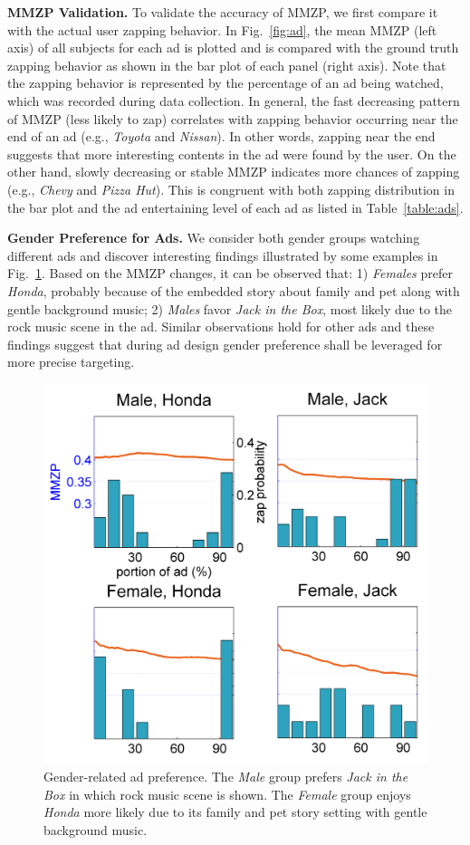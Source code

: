 \documentclass[twoside,leqno,twocolumn]{article}
\begin{document}
\noindent \textbf{MMZP Validation.} To validate the accuracy of MMZP, we first compare it with the actual user zapping behavior. In Fig.~\ref{fig:ad}, the mean MMZP (left axis) of all subjects for each ad is plotted and is compared with the ground truth zapping behavior as shown in the bar plot of each panel (right axis). Note that the zapping behavior is represented by the percentage of an ad being watched, which was recorded during data collection. In general, the fast decreasing pattern of MMZP (less likely to zap) correlates with zapping behavior occurring near the end of an ad (e.g., \textit{Toyota} and \textit{Nissan}). In other words, zapping near the end suggests that more interesting contents in the ad were found by the user. On the other hand, slowly decreasing or stable MMZP indicates more chances of zapping (e.g., \textit{Chevy} and \textit{Pizza Hut}). This is congruent with both zapping distribution in the bar plot and the ad entertaining level of each ad as listed in Table~\ref{table:ads}. 

\noindent \textbf{Gender Preference for Ads.} We consider both gender groups watching different ads and discover interesting findings illustrated by some examples in Fig.~\ref{fig:ad_gend}. Based on the MMZP changes, it can be observed that: 1) \textit{Females} prefer \textit{Honda}, probably because of the embedded story about family and pet along with gentle background music; 2) \textit{Males} favor \textit{Jack in the Box}, most likely due to the rock music scene in the ad. Similar observations hold for other ads and these findings suggest that during ad design gender preference shall be leveraged for more precise targeting. 

\begin{figure}[h]
	\centering
		\includegraphics[width=.8\columnwidth]{fig/ad_gend.png}
	\caption{Gender-related ad preference. The \textit{Male} group prefers \textit{Jack in the Box} in which rock music scene is shown. The \textit{Female} group enjoys \textit{Honda} more likely due to its family and pet story setting with gentle background music.}
	\label{fig:ad_gend}
\end{figure}
\end{document}
